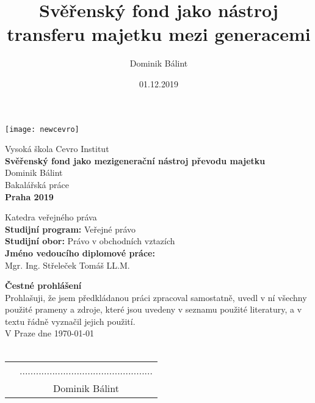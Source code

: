 \documentclass{article}
\begin{document}
\title{Svěřenský fond jako nástroj transferu majetku mezi generacemi}
\author{Dominik Bálint}
\date{01.12.2019}

  \texttt{[image: newcevro]} \\
  \vspace{15mm}
  \begin{center}
  {\Large Vysoká škola Cevro Institut} \\
  \vspace{15mm}
  {\Large \textbf{Svěřenský fond jako mezigenerační nástroj převodu majetku}} \\
  \vspace{15mm}
  {\Large Dominik Bálint} \\
  \vspace{15mm}
  {\Large Bakalářská práce} \\
  \vspace{49mm}
  {\Large \textbf{Praha 2019}} \\
  \end{center}
  
\newpage
  \maketitle
  \begin{center}
  {\Large Katedra veřejného práva} \\	
  \vspace{15mm}
  {\Large \textbf{Studijní program:} Veřejné právo} \\
  {\Large \textbf{Studijní obor:} Právo v obchodních vztazích} \\
  {\Large \textbf{Jméno vedoucího diplomové práce:} } \\
  {\Large Mgr. Ing.  Střeleček  Tomáš LL.M.} \\
  \end{center}
  
\newpage
  \thispagestyle{empty}
  \vspace*{\fill}

\noindent \textbf{Čestné prohlášení} \\

Prohlašuji, že jsem předkládanou práci zpracoval samostatně, uvedl
v ní všechny použité prameny a zdroje, které jsou uvedeny v seznamu použité
literatury, a v textu řádně vyznačil jejich použití. \\

\noindent V Praze dne \today \\
\vspace{10mm} \\
\begin{tabular}{p{6cm}c}
& ................................................. \\
& Dominik Bálint
\end{tabular}
\end{document}
